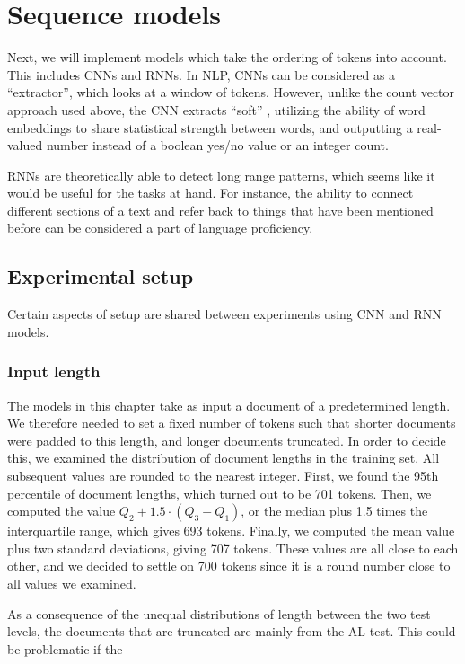 \chapter{Sequence models}

Next, we will implement models which take the ordering of tokens into
account. This includes \acp{CNN} and \acp{RNN}. In \ac{NLP}, \acp{CNN} can be
considered as a ``\ngram extractor'', which looks at a window of tokens.
However, unlike the count vector approach used above, the CNN extracts
``soft'' \ngrams, utilizing the ability of word embeddings to share
statistical strength between words, and outputting a real-valued number
instead of a boolean yes/no value or an integer count.

\acp{RNN} are theoretically able to detect long range patterns, which seems
like it would be useful for the tasks at hand. For instance, the ability to
connect different sections of a text and refer back to things that have been
mentioned before can be considered a part of language proficiency.


\section{Experimental setup}

Certain aspects of setup are shared between experiments using \ac{CNN} and
\ac{RNN} models.


\subsection{Input length}

The models in this chapter take as input a document of a predetermined
length. We therefore needed to set a fixed number of tokens such that shorter
documents were padded to this length, and longer documents truncated. In
order to decide this, we examined the distribution of document lengths in the
training set. All subsequent values are rounded to the nearest integer.
First, we found the 95th percentile of document lengths, which turned out to
be 701 tokens. Then, we computed the value $Q_2 + 1.5 \cdot (Q_3 - Q_1)$, or
the median plus 1.5 times the interquartile range, which gives 693 tokens.
Finally, we computed the mean value plus two standard deviations, giving 707
tokens. These values are all close to each other, and we decided to settle on
700 tokens since it is a round number close to all values we examined.

As a consequence of the unequal distributions of length between the two test
levels, the documents that are truncated are mainly from the AL test. This
could be problematic if the 



